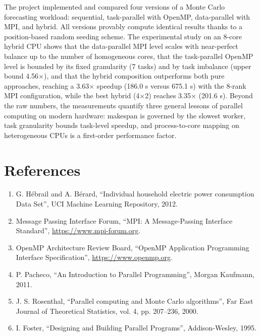 \documentclass[12pt,a4paper]{article}
\begin{document}
The project implemented and compared four versions of a Monte Carlo
forecasting workload: sequential, task-parallel with OpenMP,
data-parallel with MPI, and hybrid. All versions provably compute
identical results thanks to a position-based random seeding scheme. The
experimental study on an 8-core hybrid CPU shows that the data-parallel
MPI level scales with near-perfect balance up to the number of
homogeneous cores, that the task-parallel OpenMP level is bounded by its
fixed granularity (7 tasks) and by task imbalance (upper bound 4.56$\times$),
and that the hybrid composition outperforms both pure approaches,
reaching a 3.63$\times$ speedup (186.0 s versus 675.1 s) with the 8-rank MPI
configuration, while the best hybrid (4$\times$2) reaches 3.35$\times$ (201.6 s).
Beyond the raw numbers, the measurements quantify three general lessons
of parallel computing on modern hardware: makespan is governed by the
slowest worker, task granularity bounds task-level speedup, and
process-to-core mapping on heterogeneous CPUs is a first-order
performance factor.

\section{References}

\begin{enumerate}
\item G. H\'{e}brail and A. B\'{e}rard, ``Individual household electric power
consumption Data Set'', UCI Machine Learning Repository, 2012.

\item Message Passing Interface Forum, ``MPI: A Message-Passing
Interface Standard'', \url{https://www.mpi-forum.org}.

\item OpenMP Architecture Review Board, ``OpenMP Application
Programming Interface Specification'', \url{https://www.openmp.org}.

\item P. Pacheco, ``An Introduction to Parallel Programming'', Morgan
Kaufmann, 2011.

\item J. S. Rosenthal, ``Parallel computing and Monte Carlo
algorithms'', Far East Journal of Theoretical Statistics, vol. 4, pp.
207--236, 2000.

\item I. Foster, ``Designing and Building Parallel Programs'',
Addison-Wesley, 1995.
\end{enumerate}
\end{document}
